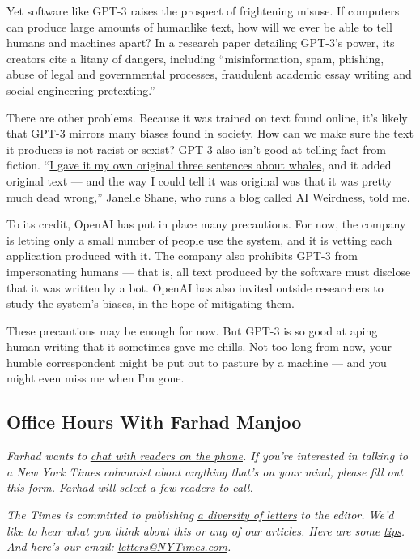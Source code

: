 Yet software like GPT-3 raises the prospect of frightening misuse. If
computers can produce large amounts of humanlike text, how will we ever
be able to tell humans and machines apart? In a research paper detailing
GPT-3's power, its creators cite a litany of dangers, including
``misinformation, spam, phishing, abuse of legal and governmental
processes, fraudulent academic essay writing and social engineering
pretexting.''

There are other problems. Because it was trained on text found online,
it's likely that GPT-3 mirrors many biases found in society. How can we
make sure the text it produces is not racist or sexist? GPT-3 also isn't
good at telling fact from fiction.
``\href{https://aiweirdness.com/post/623543644426829825/facts-about-whales}{I
gave it my own original three sentences about whales}, and it added
original text --- and the way I could tell it was original was that it
was pretty much dead wrong,'' Janelle Shane, who runs a blog called AI
Weirdness, told me.

To its credit, OpenAI has put in place many precautions. For now, the
company is letting only a small number of people use the system, and it
is vetting each application produced with it. The company also prohibits
GPT-3 from impersonating humans --- that is, all text produced by the
software must disclose that it was written by a bot. OpenAI has also
invited outside researchers to study the system's biases, in the hope of
mitigating them.

These precautions may be enough for now. But GPT-3 is so good at aping
human writing that it sometimes gave me chills. Not too long from now,
your humble correspondent might be put out to pasture by a machine ---
and you might even miss me when I'm gone.

\hypertarget{office-hours-with-farhad-manjoo}{%
\subsection{Office Hours With Farhad
Manjoo}\label{office-hours-with-farhad-manjoo}}

\emph{Farhad wants to}
\href{https://www.nytimes3xbfgragh.onion/2019/05/16/opinion/farhad-office-hours.html?module=inline}{\emph{chat
with readers on the phone}}\emph{. If you're interested in talking to a
New York Times columnist about anything that's on your mind, please fill
out this form. Farhad will select a few readers to call.}

\emph{The Times is committed to publishing}
\href{https://www.nytimes3xbfgragh.onion/2019/01/31/opinion/letters/letters-to-editor-new-york-times-women.html}{\emph{a
diversity of letters}} \emph{to the editor. We'd like to hear what you
think about this or any of our articles. Here are some}
\href{https://help.nytimes3xbfgragh.onion/hc/en-us/articles/115014925288-How-to-submit-a-letter-to-the-editor}{\emph{tips}}\emph{.
And here's our email:}
\href{mailto:letters@NYTimes.com}{\emph{letters@NYTimes.com}}\emph{.}

